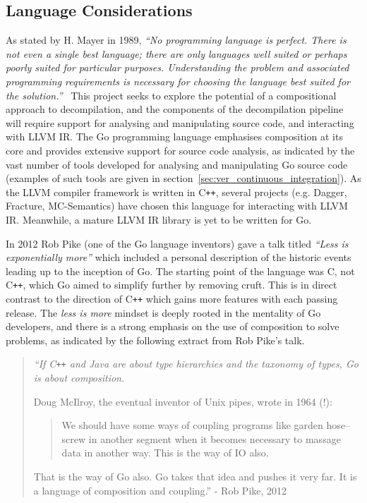 

\subsection{Language Considerations}

As stated by H. Mayer in 1989, \textit{``No programming language is perfect. There is not even a single best language; there are only languages well suited or perhaps poorly suited for particular purposes. Understanding the problem and associated programming requirements is necessary for choosing the language best suited for the solution.''}~\cite{no_perfect_lang_quote} This project seeks to explore the potential of a compositional approach to decompilation, and the components of the decompilation pipeline will require support for analysing and manipulating source code, and interacting with LLVM IR. The Go programming language emphasises composition at its core and provides extensive support for source code analysis, as indicated by the vast number of tools developed for analysing and manipulating Go source code (examples of such tools are given in section~\ref{sec:ver_continuous_integration}). As the LLVM compiler framework is written in C\texttt{++}, several projects (e.g. Dagger, Fracture, MC-Semantics) have chosen this language for interacting with LLVM IR. Meanwhile, a mature LLVM IR library is yet to be written for Go.

In 2012 Rob Pike (one of the Go language inventors) gave a talk titled \textit{``Less is exponentially more''} which included a personal description of the historic events leading up to the inception of Go. The starting point of the language was C, not C\texttt{++}, which Go aimed to simplify further by removing cruft. This is in direct contrast to the direction of C\texttt{++} which gains more features with each passing release. The \textit{less is more} mindset is deeply rooted in the mentality of Go developers, and there is a strong emphasis on the use of composition to solve problems, as indicated by the following extract from Rob Pike's talk.

\begin{quote}
	\itshape
	``If C\texttt{++} and Java are about type hierarchies and the taxonomy of types, Go is about composition.

	Doug McIlroy, the eventual inventor of Unix pipes, wrote in 1964 (!):

	\begin{quote}
		We should have some ways of coupling programs like garden hose--screw in another segment when it becomes necessary to massage data in another way. This is the way of IO also.
	\end{quote}

	That is the way of Go also. Go takes that idea and pushes it very far. It is a language of composition and coupling.''
	\normalfont
	- Rob Pike, 2012~\cite{less_is_more}
\end{quote}

